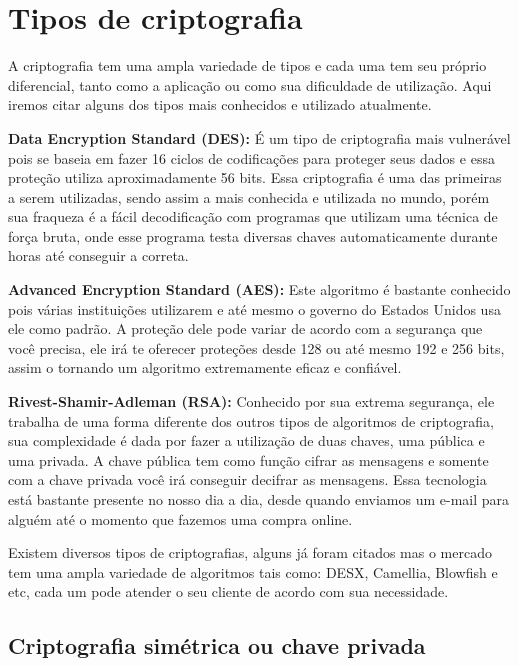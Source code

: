 \section{\textbf{Tipos de criptografia}}
\par A criptografia tem uma ampla variedade de tipos e cada uma tem seu próprio diferencial, tanto como a aplicação ou como sua dificuldade de utilização. Aqui iremos citar alguns dos tipos mais conhecidos e utilizado atualmente.
 
\textbf{Data Encryption Standard (DES):} É um tipo de criptografia mais vulnerável pois se baseia em fazer 16 ciclos de codificações para proteger seus dados e essa proteção utiliza aproximadamente 56 bits.
Essa criptografia é uma das primeiras a serem utilizadas, sendo assim a mais conhecida e utilizada no mundo, porém sua fraqueza é a fácil decodificação com programas que utilizam uma técnica de força bruta, onde esse programa testa diversas chaves automaticamente durante horas até conseguir a correta. 

\textbf{Advanced Encryption Standard (AES):} Este algoritmo é bastante conhecido pois várias instituições utilizarem e até mesmo o governo do Estados Unidos usa ele como padrão.
A proteção dele pode variar de acordo com a segurança que você precisa, ele irá te oferecer proteções desde 128 ou até mesmo 192 e 256 bits, assim o tornando um algoritmo extremamente eficaz e confiável.

\textbf{Rivest-Shamir-Adleman (RSA):} Conhecido por sua extrema segurança, ele trabalha de uma forma diferente dos outros tipos de algoritmos de criptografia, sua complexidade é dada por fazer a utilização de duas chaves, uma pública e uma privada.
A chave pública tem como função cifrar as mensagens e somente com a chave privada você irá conseguir decifrar as mensagens. Essa tecnologia está bastante presente no nosso dia a dia, desde quando enviamos um e-mail para alguém até o momento que fazemos uma compra online.

\par Existem diversos tipos de criptografias, alguns já foram citados mas o mercado tem uma ampla variedade de algoritmos tais como: DESX, Camellia, Blowfish e etc, cada um pode atender o seu cliente de acordo com sua necessidade.

\newpage
\subsection{\textbf{Criptografia simétrica ou chave privada}}

